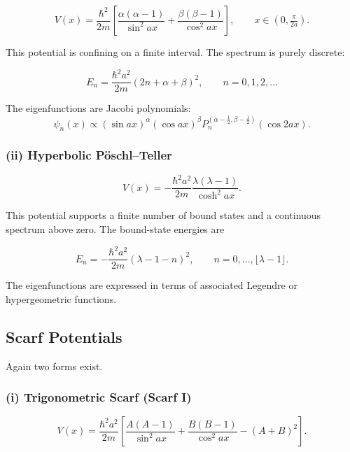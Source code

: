 \documentclass[11pt]{article}
\begin{document}
\begin{equation}
V(x)
=
\frac{\hbar^2}{2m}
\left[
\frac{\alpha(\alpha-1)}{\sin^2 ax}
+
\frac{\beta(\beta-1)}{\cos^2 ax}
\right],
\qquad
x\in(0,\tfrac{\pi}{2a}).
\end{equation}

This potential is confining on a finite interval.
The spectrum is purely discrete:

\begin{equation}
E_n
=
\frac{\hbar^2 a^2}{2m}
(2n+\alpha+\beta)^2,
\qquad n=0,1,2,\dots
\end{equation}

The eigenfunctions are Jacobi polynomials:
\begin{equation}
\psi_n(x)
\propto
(\sin ax)^{\alpha}
(\cos ax)^{\beta}
P_n^{(\alpha-\frac12,\beta-\frac12)}(\cos 2ax).
\end{equation}

\medskip

\subsubsection*{(ii) Hyperbolic Pöschl--Teller}

\begin{equation}
V(x)
=
-
\frac{\hbar^2 a^2}{2m}
\frac{\lambda(\lambda-1)}{\cosh^2 ax}.
\end{equation}

This potential supports a finite number of bound states and a
continuous spectrum above zero. The bound-state energies are

\begin{equation}
E_n
=
-
\frac{\hbar^2 a^2}{2m}
(\lambda-1-n)^2,
\qquad
n=0,\dots,\lfloor \lambda-1 \rfloor.
\end{equation}

The eigenfunctions are expressed in terms of associated Legendre
or hypergeometric functions.

\subsection{Scarf Potentials}

Again two forms exist.

\subsubsection*{(i) Trigonometric Scarf (Scarf I)}

\begin{equation}
V(x)
=
\frac{\hbar^2 a^2}{2m}
\left[
\frac{A(A-1)}{\sin^2 ax}
+
\frac{B(B-1)}{\cos^2 ax}
-
(A+B)^2
\right].
\end{equation}
\end{document}
